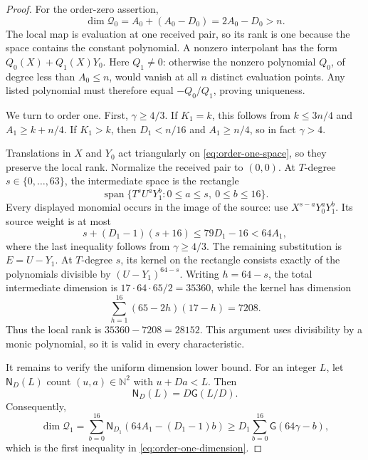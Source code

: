 \documentclass[11pt,letterpaper]{article}
\theoremstyle{definition}
\newcommand{\N}{\mathbb{N}}
\begin{document}
\begin{proof}
For the order-zero assertion,
\[
  \dim\mathcal Q_0=A_0+(A_0-D_0)=2A_0-D_0>n.
\]
The local map is evaluation at one received pair, so its rank is one because the space contains the
constant polynomial.  A nonzero interpolant has the form $Q_0(X)+Q_1(X)Y_0$.  Here $Q_1\neq0$:
otherwise the nonzero polynomial $Q_0$, of degree less than $A_0\leq n$, would vanish at all $n$
distinct evaluation points.  Any listed polynomial must therefore equal $-Q_0/Q_1$, proving uniqueness.

We turn to order one.  First, $\gamma\geq4/3$.  If $K_1=k$, this follows from
$k\leq3n/4$ and $A_1\geq k+n/4$.  If $K_1>k$, then $D_1<n/16$ and
$A_1\geq n/4$, so in fact $\gamma>4$.

Translations in $X$ and $Y_0$ act triangularly on \eqref{eq:order-one-space}, so they preserve the
local rank.  Normalize the received pair to $(0,0)$.  At $T$-degree
$s\in\{0,\ldots,63\}$, the intermediate
space is the rectangle
\[
  \operatorname{span}\{T^sU^aY_1^b:0\leq a\leq s,\ 0\leq b\leq16\}.
\]
Every displayed monomial occurs in the image of the source: use
$X^{s-a}Y_0^aY_1^b$.  Its source weight is at most
\[
  s+(D_1-1)(s+16)\leq79D_1-16<64A_1,
\]
where the last inequality follows from $\gamma\geq4/3$.  The remaining substitution is
$E=U-Y_1$.  At $T$-degree $s$, its kernel on the rectangle consists exactly of the polynomials
divisible by $(U-Y_1)^{64-s}$.  Writing $h=64-s$, the total intermediate dimension is
$17\cdot64\cdot65/2=35360$, while the kernel has dimension
\begin{equation}
  \sum_{h=1}^{16}(65-2h)(17-h)=7208.
  \label{eq:order-one-kernel-sum}
\end{equation}
Thus the local rank is $35360-7208=28152$.  This argument uses divisibility by a monic polynomial,
so it is valid in every characteristic.

It remains to verify the uniform dimension lower bound.  For an integer $L$, let
$\mathsf N_D(L)$ count $(u,a)\in\N^2$ with $u+Da<L$.  Then
\[
  \mathsf N_D(L)=D\mathsf G(L/D).
\]
Consequently,
\[
  \dim\mathcal Q_1
  =\sum_{b=0}^{16}\mathsf N_{D_1}(64A_1-(D_1-1)b)
  \geq D_1\sum_{b=0}^{16}\mathsf G(64\gamma-b),
\]
which is the first inequality in \eqref{eq:order-one-dimension}.


\end{proof}
\end{document}
